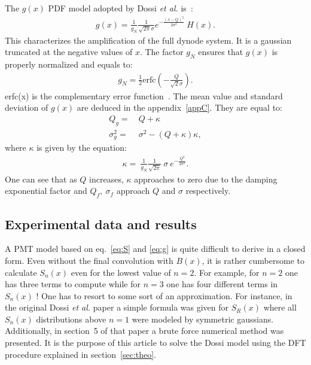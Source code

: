 \documentclass[a4paper,11pt]{article}
\begin{document}
 The $g(x)$ PDF model adopted by Dossi \emph{et al.} is~\cite{dossi}:
\begin{align}
g(x) =    \frac{1}{g_N} \frac{1}{\sqrt{2\pi}\sigma} e^{ - \frac{( x - Q )^2}{2\sigma^2}} \ H(x). \label{eq:g}
\end{align}
This characterizes the amplification of the full dynode system. 
It is a gaussian truncated at the negative values of $x$. 
The factor $g_N$ ensures that $g(x)$ is properly normalized and equals to: 
\begin{align}
g_N =  \frac{1}{2} \text{erfc} \left( -\frac{Q}{\sqrt{2}\sigma } \right).
\end{align}
erfc(x) is the complementary error function~\cite{error}. 
The mean value and standard deviation of $g(x)$ are deduced in the appendix~\ref{appC}. 
They are equal to:
\begin{align}
Q_g = & \  Q + \kappa       \label{eq:qg}         \\
\sigma_g^2       = & \  \sigma^2 - ( Q + \kappa )\kappa ,      
\end{align}
where $\kappa$ is given by the equation:
\begin{align}
 \kappa = \  \frac{1}{g_N} \frac{1}{\sqrt{2\pi}} \  \sigma \ e^{ - \frac{Q^2}{2\sigma^2}}. 
\end{align} 
One can see that as $Q$ increases, $\kappa$ approaches to zero due  to the damping exponential factor and $Q_f, \ \sigma_f$ approach $Q$ and $\sigma$ respectively.  

\subsection{Experimental data and results}
%

A PMT model based on eq.~\eqref{eq:S} and \eqref{eq:g} is quite difficult to derive in a closed form.
Even without the final convolution with $B(x)$, it is rather cumbersome to calculate $S_n(x)$ even for the lowest value of $n=2$. 
For example, for $n=2$ one has three terms to compute while for $n=3$ one has four different terms in $S_n(x)$ ! 
One has to resort to some sort of an approximation. 
For instance, in the original Dossi \emph{et al.} paper a simple formula was given for $S_R(x)$ where all $S_n(x)$ distributions above $n=1$ were modeled by symmetric gaussians. 
Additionally, in section~5 of that paper a brute force numerical method was presented. 
It is the purpose of this article to solve the Dossi model using the DFT procedure explained in section~\ref{sec:theo}. 
\end{document}
